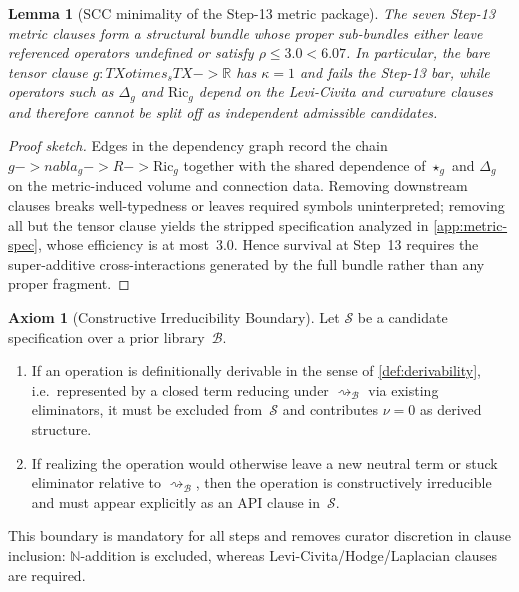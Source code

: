 \documentclass[11pt,a4paper]{article}
\def\to{->}%
\def\otimes{otimes}%
\def\nabla{nabla}%
\theoremstyle{plain}
\newtheorem{lemma}[theorem]{Lemma}
\theoremstyle{definition}
\newtheorem{axiom}[theorem]{Axiom}
\theoremstyle{remark}
\newcommand{\N}{\mathbb{N}}
\begin{document}
\begin{lemma}[SCC minimality of the Step-13 metric package]
\label{lem:metric-scc}
The seven Step-13 metric clauses form a structural bundle whose proper sub-bundles either leave referenced operators undefined or satisfy $\rho \le 3.0 < 6.07$.
In particular, the bare tensor clause $g : TX \otimes_s TX \to \mathbb{R}$ has $\kappa=1$ and fails the Step-13 bar, while operators such as $\Delta_g$ and $\mathrm{Ric}_g$ depend on the Levi-Civita and curvature clauses and therefore cannot be split off as independent admissible candidates.
\end{lemma}

\begin{proof}[Proof sketch]
Edges in the dependency graph record the chain $g \to \nabla_g \to R \to \mathrm{Ric}_g$ together with the shared dependence of $\star_g$ and $\Delta_g$ on the metric-induced volume and connection data.
Removing downstream clauses breaks well-typedness or leaves required symbols uninterpreted; removing all but the tensor clause yields the stripped specification analyzed in \cref{app:metric-spec}, whose efficiency is at most~$3.0$.
Hence survival at Step~13 requires the super-additive cross-interactions generated by the full bundle rather than any proper fragment.
\end{proof}

\begin{axiom}[Constructive Irreducibility Boundary]
\label{ax:constructive-irreducibility}
Let $\mathcal{S}$ be a candidate specification over a prior library~$\mathcal{B}$.
\begin{enumerate}[nosep]
    \item If an operation is definitionally derivable in the sense of \cref{def:derivability}, i.e.\ represented by a closed term reducing under $\rightsquigarrow_{\mathcal{B}}$ via existing eliminators, it must be excluded from~$\mathcal{S}$ and contributes $\nu=0$ as derived structure.
    \item If realizing the operation would otherwise leave a new neutral term or stuck eliminator relative to $\rightsquigarrow_{\mathcal{B}}$, then the operation is constructively irreducible and must appear explicitly as an API clause in~$\mathcal{S}$.
\end{enumerate}
This boundary is mandatory for all steps and removes curator discretion in clause inclusion: $\N$-addition is excluded, whereas Levi-Civita/Hodge/Laplacian clauses are required.
\end{axiom}
\end{document}
